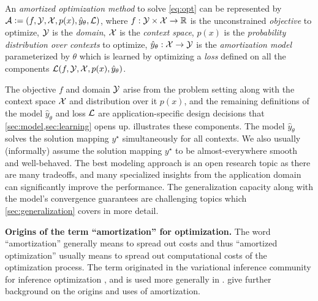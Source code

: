 \documentclass[twoside,11pt]{article}
\begin{document}
\begin{definition}
  An \emph{amortized optimization method} to solve \cref{eq:opt}
  can be represented by
  ${\mathcal{A}}\vcentcolon= (f, {\mathcal{Y}}, {\mathcal{X}}, p(x), \hat y_\theta, {\mathcal{L}})$,
  where
  $f: {\mathcal{Y}}\times{\mathcal{X}} \rightarrow \mathbb{R}$ is the
  unconstrained \emph{objective} to optimize,
  ${\mathcal{Y}}$ is the \emph{domain},
  ${\mathcal{X}}$ is the \emph{context space},
  $p(x)$ is the \emph{probability distribution over contexts} to optimize,
  $\hat y_\theta: {\mathcal{X}}\rightarrow {\mathcal{Y}}$ is the \emph{amortization model}
  parameterized by $\theta$
  which is learned by optimizing a \emph{loss}
  defined on all the components
  ${\mathcal{L}}(f, {\mathcal{Y}}, {\mathcal{X}}, p(x), \hat y_\theta)$.
  \label{def:amor}
\end{definition}

The objective $f$ and domain ${\mathcal{Y}}$ arise from
the problem setting along with the context space
${\mathcal{X}}$ and distribution over it $p(x)$, and
the remaining definitions of the model
$\hat y_\theta$ and loss ${\mathcal{L}}$ are application-specific
design decisions that \cref{sec:model,sec:learning}
opens up.
 illustrates these components.
The model $\hat y_\theta$ solves the solution mapping
$y^\star$ simultaneously for all contexts.
We also usually (informally) assume the solution mapping
$y^\star$ to be almost-everywhere smooth and well-behaved.
The best modeling approach is an open research topic
as there are many tradeoffs,
and many specialized insights from the application domain
can significantly improve the performance.
The generalization capacity along with the model's
convergence guarantees are challenging topics
which \cref{sec:generalization} covers in more detail.

\textbf{Origins of the term ``amortization'' for optimization.}
The word ``amortization'' generally means to spread out costs and
thus ``amortized optimization'' usually means to spread out
computational costs of the optimization process.
The term originated in the variational inference community
for inference optimization
\citep{kingma2013auto,rezende2014stochastic,stuhlmuller2013learning,gershman2014amortized,webb2017faithful,ravi2018amortized,cremer2018inference,wu2020meta},
and is used more generally in
\citep{xue2020amortized,sercu2021neural,xiao2021amortized}.
\citet[p.~28]{marino2021learned} give further background on the
origins and uses of amortization.
\end{document}
